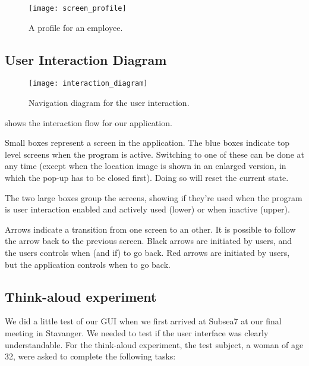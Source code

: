 \begin{figure}[H]
    \centerline{ \texttt{[image: screen\_profile]} }
    \caption{A profile for an employee.}
    \label{fig:screen_profile}
\end{figure}

\clearpage

\subsection{User Interaction Diagram}

\begin{figure}[H]
    \centerline{ \texttt{[image: interaction\_diagram]} }
    \caption{Navigation diagram for the user interaction.}
    \label{fig:interaction}
\end{figure}

 shows the interaction flow for our application.

Small boxes represent a screen in the application. The blue boxes
indicate top level screens when the program is active. Switching to
one of these can be done at any time (except when the location image
is shown in an enlarged version, in which the pop-up has to be closed
first). Doing so will reset the current state.

The two large boxes group the screens, showing if they're used when
the program is user interaction enabled and actively used (lower) or
when inactive (upper).

Arrows indicate a transition from one screen to an other. It is
possible to follow the arrow back to the previous screen. Black arrows
are initiated by users, and the users controls when (and if) to go
back. Red arrows are initiated by users, but the application controls
when to go back.



\subsection{Think-aloud experiment}

We did a little test of our GUI when we first arrived at Subsea7 at
our final meeting in Stavanger. We needed to test if the user
interface was clearly understandable. For the think-aloud experiment,
the test subject, a woman of age 32, were asked to complete the following tasks:

